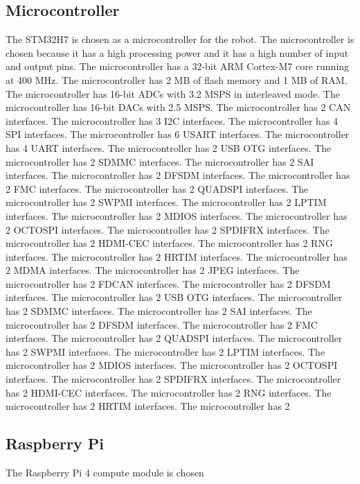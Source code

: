 \subsection{Microcontroller}
The STM32H7 is chosen as a microcontroller for the robot. The microcontroller is chosen because it has a high processing power and it has a high number of input and output pins. The microcontroller has a 32-bit ARM Cortex-M7 core running at 400 MHz. The microcontroller has 2 MB of flash memory and 1 MB of RAM. The microcontroller has 16-bit ADCs with 3.2 MSPS in interleaved mode. The microcontroller has 16-bit DACs with 2.5 MSPS. The microcontroller has 2 CAN interfaces. The microcontroller has 3 I2C interfaces. The microcontroller has 4 SPI interfaces. The microcontroller has 6 USART interfaces. The microcontroller has 4 UART interfaces. The microcontroller has 2 USB OTG interfaces. The microcontroller has 2 SDMMC interfaces. The microcontroller has 2 SAI interfaces. The microcontroller has 2 DFSDM interfaces. The microcontroller has 2 FMC interfaces. The microcontroller has 2 QUADSPI interfaces. The microcontroller has 2 SWPMI interfaces. The microcontroller has 2 LPTIM interfaces. The microcontroller has 2 MDIOS interfaces. The microcontroller has 2 OCTOSPI interfaces. The microcontroller has 2 SPDIFRX interfaces. The microcontroller has 2 HDMI-CEC interfaces. The microcontroller has 2 RNG interfaces. The microcontroller has 2 HRTIM interfaces. The microcontroller has 2 MDMA interfaces. The microcontroller has 2 JPEG interfaces. The microcontroller has 2 FDCAN interfaces. The microcontroller has 2 DFSDM interfaces. The microcontroller has 2 USB OTG interfaces. The microcontroller has 2 SDMMC interfaces. The microcontroller has 2 SAI interfaces. The microcontroller has 2 DFSDM interfaces. The microcontroller has 2 FMC interfaces. The microcontroller has 2 QUADSPI interfaces. The microcontroller has 2 SWPMI interfaces. The microcontroller has 2 LPTIM interfaces. The microcontroller has 2 MDIOS interfaces. The microcontroller has 2 OCTOSPI interfaces. The microcontroller has 2 SPDIFRX interfaces. The microcontroller has 2 HDMI-CEC interfaces. The microcontroller has 2 RNG interfaces. The microcontroller has 2 HRTIM interfaces. The microcontroller has 2
\subsection{Raspberry Pi}
The Raspberry Pi 4 compute module is chosen

